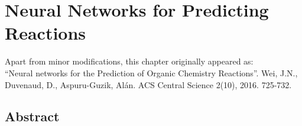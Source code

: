 \chapter{Neural Networks for Predicting Reactions}\label{sec:reaction_prediction}
\thispagestyle{plain}
\vspace{-.5cm}

\noindent Apart from minor modifications, this chapter originally appeared as:\newline\\
\ssp ``Neural networks for the Prediction of Organic Chemistry Reactions''.
Wei, J.N., Duvenaud, D., Aspuru-Guzik, Al\'an. ACS Central Science 2(10), 2016. 725-732.

\section*{Abstract}
    \dsp
    



